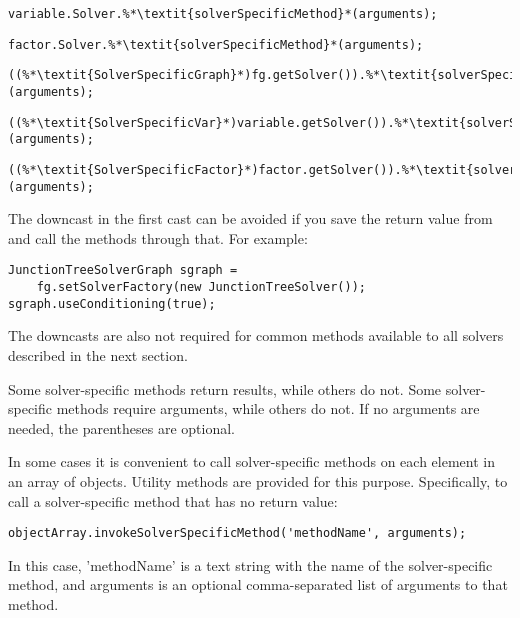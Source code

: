\begin{lstlisting}
variable.Solver.%*\textit{solverSpecificMethod}*(arguments);
\end{lstlisting}

\begin{lstlisting}
factor.Solver.%*\textit{solverSpecificMethod}*(arguments);
\end{lstlisting}
\fi

\ifjava
\begin{lstlisting}
((%*\textit{SolverSpecificGraph}*)fg.getSolver()).%*\textit{solverSpecificMethod}*(arguments);
\end{lstlisting}

\begin{lstlisting}
((%*\textit{SolverSpecificVar}*)variable.getSolver()).%*\textit{solverSpecificMethod}*(arguments);
\end{lstlisting}

\begin{lstlisting}
((%*\textit{SolverSpecificFactor}*)factor.getSolver()).%*\textit{solverSpecificMethod}*(arguments);
\end{lstlisting}

The downcast in the first cast can be avoided if you save the return value from  and call the methods through that. For example:

\begin{lstlisting}
JunctionTreeSolverGraph sgraph =
    fg.setSolverFactory(new JunctionTreeSolver());
sgraph.useConditioning(true);
\end{lstlisting}

The downcasts are also not required for common methods available to all solvers described in the next section.
\fi

Some solver-specific methods return results, while others do not.  Some solver-specific methods require arguments, while others do not.  \ifmatlab If no arguments are needed, the parentheses are optional. \fi

\ifmatlab

In some cases it is convenient to call solver-specific methods on each element in an array of objects.  Utility methods are provided for this purpose.  Specifically, to call a solver-specific method that has no return value:
\begin{lstlisting}
objectArray.invokeSolverSpecificMethod('methodName', arguments);
\end{lstlisting}

In this case, 'methodName' is a text string with the name of the solver-specific method, and arguments is an optional comma-separated list of arguments to that method.

